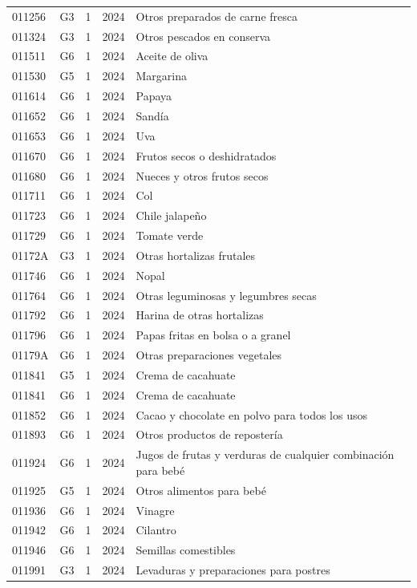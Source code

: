 \begin{table}[ht]
\begin{tabular}{llrll}
  011256 & G3 &   1 & 2024 & Otros preparados de carne fresca \\ 
  011324 & G3 &   1 & 2024 & Otros pescados en conserva \\ 
  011511 & G6 &   1 & 2024 & Aceite de oliva \\ 
  011530 & G5 &   1 & 2024 & Margarina \\ 
  011614 & G6 &   1 & 2024 & Papaya \\ 
  011652 & G6 &   1 & 2024 & Sandía \\ 
  011653 & G6 &   1 & 2024 & Uva \\ 
  011670 & G6 &   1 & 2024 & Frutos secos o deshidratados \\ 
  011680 & G6 &   1 & 2024 & Nueces y otros frutos secos \\ 
  011711 & G6 &   1 & 2024 & Col \\ 
  011723 & G6 &   1 & 2024 & Chile jalapeño \\ 
  011729 & G6 &   1 & 2024 & Tomate verde \\ 
  01172A & G3 &   1 & 2024 & Otras hortalizas frutales \\ 
  011746 & G6 &   1 & 2024 & Nopal \\ 
  011764 & G6 &   1 & 2024 & Otras leguminosas y legumbres secas \\ 
  011792 & G6 &   1 & 2024 & Harina de otras hortalizas \\ 
  011796 & G6 &   1 & 2024 & Papas fritas en bolsa o a granel \\ 
  01179A & G6 &   1 & 2024 & Otras preparaciones vegetales \\ 
  011841 & G5 &   1 & 2024 & Crema de cacahuate \\ 
  011841 & G6 &   1 & 2024 & Crema de cacahuate \\ 
  011852 & G6 &   1 & 2024 & Cacao y chocolate en polvo para todos los usos \\ 
  011893 & G6 &   1 & 2024 & Otros productos de repostería \\ 
  011924 & G6 &   1 & 2024 & Jugos de frutas y verduras de cualquier combinación para bebé \\ 
  011925 & G5 &   1 & 2024 & Otros alimentos para bebé \\ 
  011936 & G6 &   1 & 2024 & Vinagre \\ 
  011942 & G6 &   1 & 2024 & Cilantro \\ 
  011946 & G6 &   1 & 2024 & Semillas comestibles \\ 
  011991 & G3 &   1 & 2024 & Levaduras y preparaciones para postres \\ 

\end{tabular}
\end{table}
